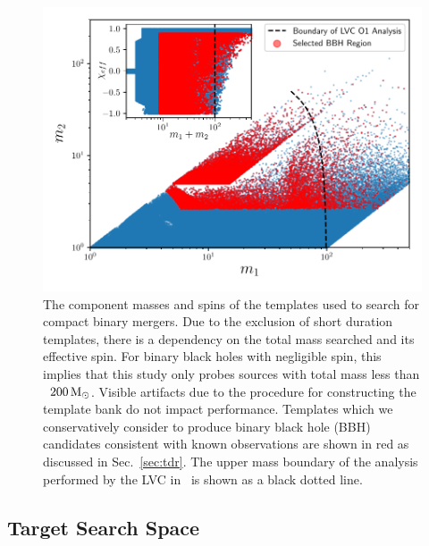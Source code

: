 \begin{figure}[h]
  \centering
    \includegraphics[width=\columnwidth]{figs/chapter4/bank.pdf}
\caption{The component masses and spins of the templates used to search for compact binary mergers. Due to the exclusion of short duration templates, there is a dependency on the total mass searched and its effective spin. For binary black holes with negligible spin, this implies that this study only probes sources with total mass less than ~$200\,\mathrm{M}_{\odot}$. Visible artifacts due to the procedure for constructing the template bank do not impact performance. Templates which we conservatively consider to produce binary black hole (BBH) candidates consistent with known observations are shown in red as discussed in Sec.~\ref{sec:tdr}. The upper mass boundary of the analysis performed by the LVC in~\cite{TheLIGOScientific:2016pea} is shown
as a black dotted line.}
\label{fig:bank}
\end{figure}

\subsection{Target Search Space}

